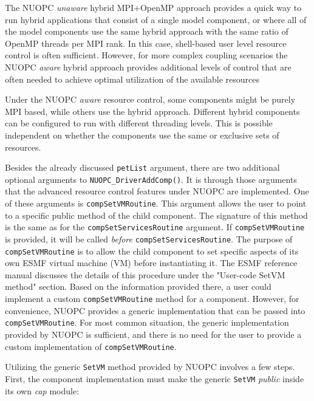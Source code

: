 The NUOPC {\em unaware} hybrid MPI+OpenMP approach provides a quick way to run hybrid applications that consist of a single model component, or where all of the model components use the same hybrid approach with the same ratio of OpenMP threads per MPI rank. In this case, shell-based user level resource control is often sufficient. However, for more complex coupling scenarios the NUOPC {\em aware} hybrid approach provides additional levels of control that are often needed to achieve optimal utilization of the available resources

Under the NUOPC {\em aware} resource control, some components might be purely MPI based, while others use the hybrid approach. Different hybrid components can be configured to run with different threading levels. This is possible independent on whether the components use the same or exclusive sets of resources.

Besides the already discussed {\tt petList} argument, there are two additional optional arguments to {\tt NUOPC\_DriverAddComp()}. It is through those arguments that the advanced resource control features under NUOPC are implemented. One of these arguments is {\tt compSetVMRoutine}. This argument allows the user to point to a specific public method of the child component. The signature of this method is the same as for the {\tt compSetServicesRoutine} argument. If {\tt compSetVMRoutine} is provided, it will be called {\em before} {\tt compSetServicesRoutine}. The purpose of {\tt compSetVMRoutine} is to allow the child component to set specific aspects of its own ESMF virtual machine (VM) before instantiating it. The ESMF reference manual discusses the details of this procedure under the "User-code SetVM method" section. Based on the information provided there, a user could implement a custom {\tt compSetVMRoutine} method for a component. However, for convenience, NUOPC provides a generic implementation that can be passed into {\tt compSetVMRoutine}. For most common situation, the generic implementation provided by NUOPC is sufficient, and there is no need for the user to provide a custom implementation of {\tt compSetVMRoutine}.

Utilizing the generic {\tt SetVM} method provided by NUOPC involves a few steps. First, the component implementation must make the generic {\tt SetVM} {\em public} inside its own {\em cap} module:

